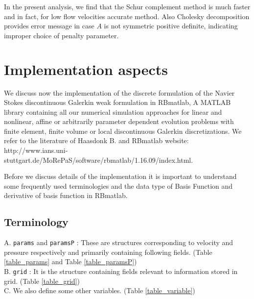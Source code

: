 \documentclass[a4paper]{book}
\begin{document}
In the present analysis, we find that the Schur complement method is much faster and in fact, for low flow velocities accurate method. Also Cholesky decomposition provides error message in case $A$ is not symmetric positive definite, indicating improper choice of penalty parameter. 

\chapter{Implementation aspects} \label{implementation_aspects}

We discuss now the implementation of the discrete formulation of the Navier Stokes discontinuous Galerkin weak formulation in RBmatlab, A MATLAB library containing all our numerical simulation approaches for linear and nonlinear, affine or arbitrarily parameter dependent evolution problems with finite element, finite volume or local discontinuous Galerkin discretizations. We refer to the literature of Haasdonk B.\cite{Haasdonk_book} and RBmatlab website: \\
http://www.ians.uni-stuttgart.de/MoRePaS/software/rbmatlab/1.16.09/\linebreak index.html.  

Before we discuss details of the implementation it is important to understand some frequently used terminologies and the data type of Basis Function and derivative of basis function in RBmatlab.

\section{Terminology}

A. \verb|params| and \verb|paramsP| : These are structures corresponding to velocity and pressure respectively and primarily containing following fields. (Table \ref{table_params} and Table \ref{table_paramsP})\\

B. \verb|grid| : It is the structure containing fields relevant to information stored in grid. (Table \ref{table_grid})\\

C. We also define some other variables. (Table \ref{table_variable})\\
\end{document}
